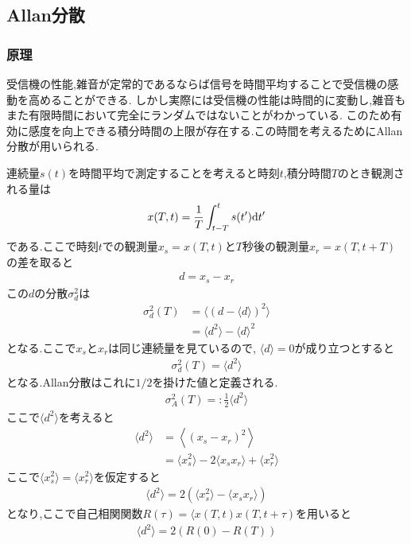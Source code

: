 \subsection{Allan分散}
\subsubsection{原理}
受信機の性能,雑音が定常的であるならば信号を時間平均することで受信機の感動を高めることができる.
しかし実際には受信機の性能は時間的に変動し,雑音もまた有限時間において完全にランダムではないことがわかっている.
このため有効に感度を向上できる積分時間の上限が存在する.この時間を考えるためにAllan分散が用いられる.

連続量$s(t)$を時間平均で測定することを考えると時刻$t$,積分時間$T$のとき観測される量は
\begin{align}
  x(T,t)=\frac{1}{T}\int^t_{t-T}s(t'){\rm d}t'
\end{align}
である.ここで時刻$t$での観測量$x_s=x(T,t)$と$T$秒後の観測量$x_r=x(T,t+T)$の差を取ると
\begin{align}
  d=x_s-x_r
\end{align}
この$d$の分散$\sigma_d^2$は
\begin{align}
  \sigma_d^2(T)&=\langle(d-\langle d\rangle)^2\rangle\nonumber\\
  &=\langle d^2\rangle-\langle d\rangle^2
\end{align}
となる.ここで$x_s$と$x_r$は同じ連続量を見ているので, $\langle d\rangle=0$が成り立つとすると
\begin{align}
  \sigma_d^2(T)=\langle d^2\rangle
\end{align}
となる.Allan分散はこれに$1/2$を掛けた値と定義される.
\begin{align}
  \sigma_A^2(T)=:\frac{1}{2}\langle d^2\rangle
\end{align}
ここで$\langle d^2\rangle$を考えると
\begin{align}
  \langle d^2\rangle&=\left\langle(x_s-x_r)^2\right\rangle\nonumber\\
  &=\langle x_s^2\rangle-2\langle x_sx_r\rangle+\langle x_r^2\rangle\nonumber
\end{align}
ここで$\langle x_s^2\rangle=\langle x_r^2\rangle$を仮定すると
\begin{align}
  \langle d^2\rangle=2(\langle x_s^2\rangle-\langle x_sx_r\rangle)\nonumber
\end{align}
となり,ここで自己相関関数$R(\tau)=\langle x(T,t)x(T,t+\tau)$を用いると
\begin{align}
  \langle d^2\rangle=2(R(0)-R(T))
\end{align}

